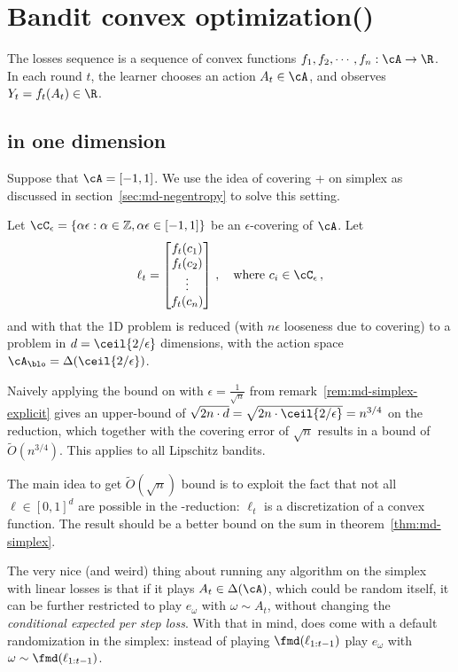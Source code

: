\section{Bandit convex optimization(\bco)}
The losses sequence is a sequence of convex functions
$f_1, f_2, \cdots, f_n: \cA \to \R$.
In each round $t$, the learner chooses an action $A_t \in \cA$,
and observes $Y_t = f_t(A_t) \in \R$.
\subsection{\bco in one dimension}
Suppose that $\cA = [-1, 1]$.
We use the idea of covering + \mdalg on simplex as discussed in
section~\ref{sec:md-negentropy} to solve this setting.

Let $\cC_\epsilon = \{ \alpha\epsilon: \alpha \in \mathbb{Z}, \alpha\epsilon \in [-1, 1]\}$ be an $\epsilon$-covering of $\cA$.
Let
\begin{align*}
    \ell_t =
    \begin{bmatrix}
        f_t(c_1) \\
        f_t(c_2) \\
        \vdots   \\
        f_t(c_n)
    \end{bmatrix}\,, \quad \text{where } c_i \in \cC_\epsilon\,,
\end{align*}
and with that the 1D \bco problem is reduced (with $n\epsilon$ looseness
due to covering) to a \blo problem in $d=\ceil{2/\epsilon}$ dimensions,
with the action space $\cA_\blo = \Delta(\ceil{2/\epsilon})$.

\begin{remark}
    Naively applying the bound on \mdalg with $\epsilon=\frac{1}{\sqrt{n}}$
    from remark~\ref{rem:md-simplex-explicit} gives an upper-bound of
    $\sqrt{2 n \cdot d} = \sqrt{2 n \cdot \ceil{2/\epsilon}}= n^{3/4}$
    on the \blo reduction, which together with the covering
    error of $\sqrt{n}$ results in a bound of $\tilde{O}(n^{3/4})$.
    This applies to all Lipschitz bandits.
\end{remark}

The main idea to get $\widetilde{O}(\sqrt{n})$ bound is to exploit
the fact that not all $\ell \in [0,1]^d$ are possible in the
\blo-reduction: $\ell_t$ is a discretization of a
convex function.
The result should be a better bound on the sum in
theorem~\ref{thm:md-simplex}.

\begin{remark}[Actions are distributions when $\cA=\Delta(d)$]\label{rem:actions-are-dists}
    The very nice (and weird) thing about running any algorithm
    on the simplex with linear losses is that if it plays $A_t \in \Delta(\cA)$,
    which could be random itself, it can be further
    restricted to play $e_{\omega}$ with $\omega \sim A_t$, without
    changing the \textit{conditional expected per step loss}.
    With that in mind, \mdalg does come with a default randomization
    in the simplex: instead of playing $\fmd(\ell_{1:t-1})$
    play $e_\omega$ with $\omega \sim \fmd(\ell_{1:t-1})$.
\end{remark}

